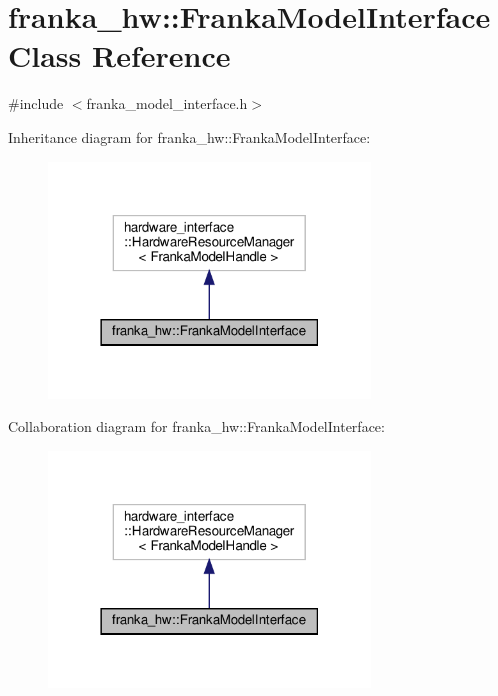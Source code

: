 \hypertarget{classfranka__hw_1_1_franka_model_interface}{}\section{franka\+\_\+hw\+:\+:Franka\+Model\+Interface Class Reference}
\label{classfranka__hw_1_1_franka_model_interface}


{\ttfamily \#include $<$franka\+\_\+model\+\_\+interface.\+h$>$}



Inheritance diagram for franka\+\_\+hw\+:\+:Franka\+Model\+Interface\+:
\nopagebreak
\begin{figure}[H]
\begin{center}
\leavevmode
\includegraphics[width=242pt]{classfranka__hw_1_1_franka_model_interface__inherit__graph}
\end{center}
\end{figure}


Collaboration diagram for franka\+\_\+hw\+:\+:Franka\+Model\+Interface\+:
\nopagebreak
\begin{figure}[H]
\begin{center}
\leavevmode
\includegraphics[width=242pt]{classfranka__hw_1_1_franka_model_interface__coll__graph}
\end{center}
\end{figure}


